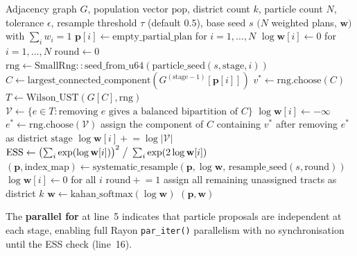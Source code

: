 \begin{algorithm}
\caption{\smc{} for Redistricting}
\label{alg:smc}
\begin{algorithmic}[1]
\Require Adjacency graph $G$, population vector $\mathrm{pop}$, district
         count $k$, particle count $N$, tolerance $\epsilon$,
         resample threshold $\tau$ (default $0.5$), base seed $s$
\Ensure  $(N$ weighted plans$,\, \mathbf{w})$ with $\sum_i w_i = 1$
\State $\mathbf{p}[i] \gets \mathrm{empty\_partial\_plan}$ for $i = 1, \ldots, N$
\State $\log \mathbf{w}[i] \gets 0$ for $i = 1, \ldots, N$
\State $\mathrm{round} \gets 0$
   
    \State $\mathrm{rng} \gets \mathrm{SmallRng::seed\_from\_u64}(\mathrm{particle\_seed}(s, \mathrm{stage}, i))$
    \State $C \gets \mathrm{largest\_connected\_component}(G^{(\mathrm{stage}-1)}[\mathbf{p}[i]])$
    \State $v^* \gets \mathrm{rng.choose}(C)$ 
    \State $T \gets \mathrm{Wilson\_UST}(G[C], \mathrm{rng})$ 
    \State $\mathcal{V} \gets \{e \in T : \text{removing } e \text{ gives a balanced bipartition of } C\}$
      \State $\log \mathbf{w}[i] \gets -\infty$ 
    \Else
      \State $e^* \gets \mathrm{rng.choose}(\mathcal{V})$ 
      \State assign the component of $C$ containing $v^*$ after removing $e^*$ as district $\mathrm{stage}$
      \State $\log \mathbf{w}[i] \mathrel{+}= \log|\mathcal{V}|$ 
    \EndIf
  \EndParFor
  \State $\mathrm{ESS} \gets \bigl(\sum_i \exp(\log \mathbf{w}[i])\bigr)^2 \;\big/\; \sum_i \exp(2 \log \mathbf{w}[i])$
    \State $(\mathbf{p}, \mathrm{index\_map}) \gets \mathrm{systematic\_resample}(\mathbf{p}, \log \mathbf{w},\, \mathrm{resample\_seed}(s, \mathrm{round}))$
    \State $\log \mathbf{w}[i] \gets 0$ for all $i$
    \State $\mathrm{round} \mathrel{+}= 1$
  \EndIf
\EndFor
\State assign all remaining unassigned tracts as district $k$ 
\State $\mathbf{w} \gets \mathrm{kahan\_softmax}(\log \mathbf{w})$ 
\State \Return $(\mathbf{p}, \mathbf{w})$
\end{algorithmic}
\end{algorithm}

The \textbf{parallel for} at line~5 indicates that particle proposals are
independent at each stage, enabling full Rayon \texttt{par\_iter()} parallelism
with no synchronisation until the ESS check (line~16).

